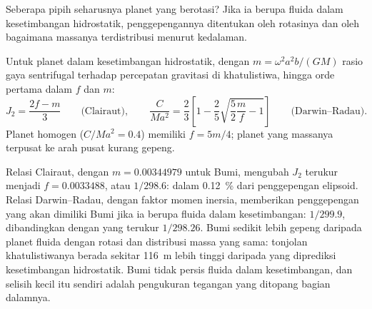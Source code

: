 Seberapa pipih seharusnya planet yang berotasi? Jika ia berupa fluida dalam
kesetimbangan hidrostatik, penggepengannya ditentukan oleh rotasinya dan oleh
bagaimana massanya terdistribusi menurut kedalaman.

\begin{proposition}\label{prop:b3:gravity-geodesy:clairaut}
Untuk planet dalam kesetimbangan hidrostatik, dengan $m = \omega^2a^2b/(GM)$ rasio
gaya sentrifugal terhadap percepatan gravitasi di khatulistiwa, hingga orde pertama
dalam $f$ dan $m$:
\[
  J_2 = \frac{2f - m}{3}\qquad\text{(Clairaut)},\qquad
  \frac{C}{Ma^2} = \frac23\left[1 - \frac25\sqrt{\frac52\frac mf - 1}\right]
  \qquad\text{(Darwin--Radau)} .
\]
Planet homogen ($C/Ma^2 = 0.4$) memiliki $f = 5m/4$; planet yang massanya
terpusat ke arah pusat kurang gepeng.
\end{proposition}
\admitted

Relasi Clairaut, dengan $m = \num{0.00344979}$ untuk Bumi, mengubah
$J_2$ terukur menjadi $f = \num{0.0033488}$, atau $1/298.6$: dalam
\qty{0.12}{\percent} dari penggepengan elipsoid. Relasi Darwin--Radau,
dengan faktor momen inersia, memberikan penggepengan yang akan dimiliki Bumi
jika ia berupa fluida dalam kesetimbangan: $1/299.9$, dibandingkan dengan yang
terukur $1/298.26$. Bumi sedikit lebih gepeng daripada planet fluida dengan rotasi
dan distribusi massa yang sama: tonjolan khatulistiwanya berada sekitar
\qty{116}{m} lebih tinggi daripada yang diprediksi kesetimbangan hidrostatik. Bumi tidak
persis fluida dalam kesetimbangan, dan selisih kecil itu sendiri adalah
pengukuran tegangan yang ditopang bagian dalamnya.

